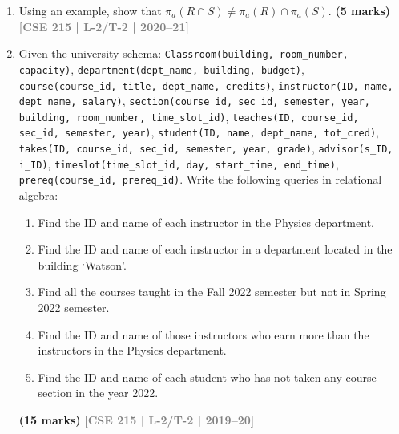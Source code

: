 \documentclass[12pt]{article}
\newcommand{\yr}[1]{\hfill\textcolor{gray}{\small\textbf{[#1]}}}
\newcommand{\mk}[1]{\textcolor{orange!70!black}{\small\textbf{(#1 marks)}}}
\begin{document}
\begin{enumerate}
\item Using an example, show that $\pi_a(R \cap S) \neq \pi_a(R) \cap \pi_a(S)$.
\mk{5} \yr{CSE 215 | L-2/T-2 | 2020--21}


\item Given the university schema: \texttt{Classroom(building, room\_number, capacity)}, \texttt{department(dept\_name, building, budget)}, \texttt{course(course\_id, title, dept\_name, credits)}, \texttt{instructor(ID, name, dept\_name, salary)}, \texttt{section(course\_id, sec\_id, semester, year, building, room\_number, time\_slot\_id)}, \texttt{teaches(ID, course\_id, sec\_id, semester, year)}, \texttt{student(ID, name, dept\_name, tot\_cred)}, \texttt{takes(ID, course\_id, sec\_id, semester, year, grade)}, \texttt{advisor(s\_ID, i\_ID)}, \texttt{timeslot(time\_slot\_id, day, start\_time, end\_time)}, \texttt{prereq(course\_id, prereq\_id)}. Write the following queries in relational algebra:
\begin{enumerate}
  \item Find the ID and name of each instructor in the Physics department.
  \item Find the ID and name of each instructor in a department located in the building `Watson'.
  \item Find all the courses taught in the Fall 2022 semester but not in Spring 2022 semester.
  \item Find the ID and name of those instructors who earn more than the instructors in the Physics department.
  \item Find the ID and name of each student who has not taken any course section in the year 2022.
\end{enumerate}
\mk{15} \yr{CSE 215 | L-2/T-2 | 2019--20}



\end{enumerate}
\end{document}
